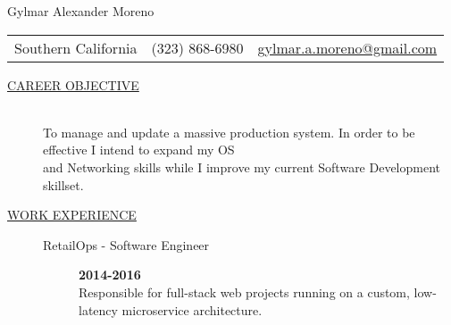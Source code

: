 \documentclass[12pt]{article}
\begin{document}
    \begin{center}
        {\LARGE Gylmar Alexander Moreno}
        \\
        \begin{tabular}{l|l|l}
            Southern California & (323) 868-6980 &
            \href{mailto:gylmar.a.moreno@gmail.com}{gylmar.a.moreno@gmail.com}
        \end{tabular}
    \end{center}
\begin{description}
    \item[\underline{CAREER OBJECTIVE}] \hfill \\
        To manage and update a massive production system. In order to be effective I intend to expand my OS\\and Networking skills while I improve my current Software Development skillset.

    \item[\underline{WORK EXPERIENCE}] \hfill
		\begin{description}
            \item[RetailOps - Software Engineer] \hfill \textbf{2014-2016}\\
                \hspace{-9mm}Responsible for full-stack web projects running on a custom, low-latency microservice architecture.


\end{description}
\end{description}
\end{document}
